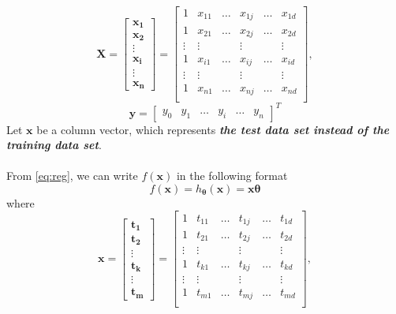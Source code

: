 \documentclass{article}
\begin{document}
       	\begin{equation}
           	\boldsymbol{X} = \begin{bmatrix} 
    			\boldsymbol{x_1}\\\boldsymbol{x_2}\\\vdots\\\boldsymbol{x_i}\\\vdots\\\boldsymbol{x_n}
    			\end{bmatrix}= \begin{bmatrix} 
    			1&x_{11}&\dots&x_{1j}&\dots&x_{1d}\\
    			1&x_{21}&\dots&x_{2j}&\dots&x_{2d}\\
    			\vdots&\vdots&     &\vdots&     &\vdots\\
    			1&x_{i1}&\dots&x_{ij}&\dots&x_{id}\\
    			\vdots&\vdots&     &\vdots&     &\vdots\\
    			1&x_{n1}&\dots&x_{nj}&\dots&x_{nd}\\
    			\end{bmatrix},
       	\end{equation}
       	\begin{equation}
       		\boldsymbol{y} = \begin{bmatrix} 
    			y_0&y_1&\dots&y_i&\dots&y_n
    			\end{bmatrix}^T
       	\end{equation}
       	Let $\boldsymbol{x}$ be a column vector, which represents \textbf{\emph{the test data set instead of the training data set}}. \\\\
       	From \eqref{eq:reg}, we can write $f(\boldsymbol{x})$ in the following format
       	\begin{equation}
            f(\boldsymbol{x}) = h_{\boldsymbol{\theta}}(\boldsymbol{x})= \boldsymbol{x}\boldsymbol{\theta}
       	\end{equation}
       	where
       	\begin{equation}
           	\boldsymbol{x} = \begin{bmatrix} 
    			\boldsymbol{t_1}\\\boldsymbol{t_2}\\\vdots\\\boldsymbol{t_k}\\\vdots\\\boldsymbol{t_m}
    			\end{bmatrix}= \begin{bmatrix} 
    			1&t_{11}&\dots&t_{1j}&\dots&t_{1d}\\
    			1&t_{21}&\dots&t_{2j}&\dots&t_{2d}\\
    			\vdots&\vdots&     &\vdots&     &\vdots\\
    			1&t_{k1}&\dots&t_{kj}&\dots&t_{kd}\\
    			\vdots&\vdots&     &\vdots&     &\vdots\\
    			1&t_{m1}&\dots&t_{mj}&\dots&t_{md}\\
    			\end{bmatrix},
       	\end{equation}
\end{document}
